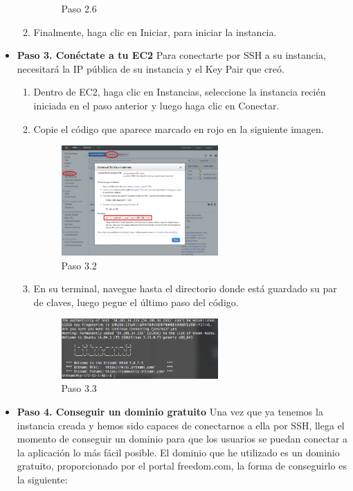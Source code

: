 \begin{itemize}
\begin{enumerate}
\begin{figure}[H]
    \caption{Paso 2.6}
    \end{figure}
    \item Finalmente, haga clic en Iniciar, para iniciar la instancia.
    \end{enumerate}
    \item \textbf{Paso 3. Conéctate a tu EC2} Para conectarte por SSH a su instancia, necesitará la IP pública de su instancia y el Key Pair que creó.
    \begin{enumerate}
    \item Dentro de EC2, haga clic en Instancias, seleccione la instancia recién iniciada en el paso anterior y luego haga clic en Conectar.
    \item Copie el código que aparece marcado en rojo en la siguiente imagen.
    \begin{figure}[H]
    \centering
    \includegraphics[width=60mm]{memoria/LaTeX/img/despliegue/paso3_2.png}
    \caption{Paso 3.2}
    \end{figure}
    \item En su terminal, navegue hasta el directorio donde está guardado su par de claves, luego pegue el último paso del código.
    \begin{figure}[H]
    \centering
    \includegraphics[width=60mm]{memoria/LaTeX/img/despliegue/paso3_3.png}
    \caption{Paso 3.3}
    \end{figure}
    \end{enumerate}
    
    \item \textbf{Paso 4. Conseguir un dominio gratuito} Una vez que ya tenemos la instancia creada y hemos sido capaces de conectarnos a ella por SSH, llega el momento de conseguir un dominio para que los usuarios se puedan conectar a la aplicación lo más fácil posible.
    El dominio que he utilizado es un dominio gratuito, proporcionado por el portal freedom.com, la forma de conseguirlo es la siguiente:
    

\end{itemize}
